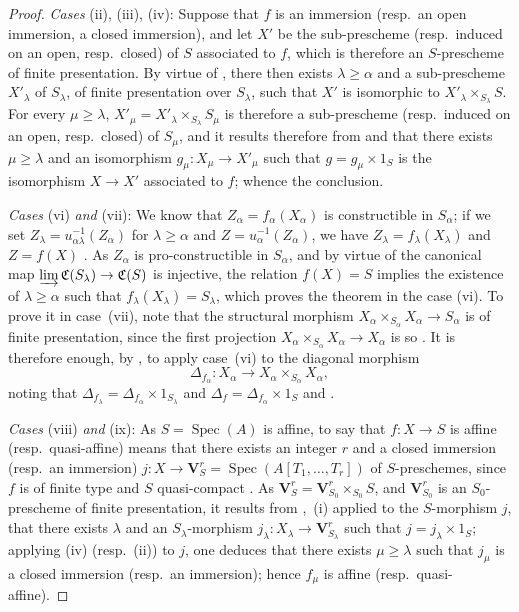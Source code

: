 \begin{proof}
\emph{Cases} (ii), (iii), (iv): Suppose that $f$ is an immersion (resp.\ an open immersion, a closed immersion), and let $X'$ be the sub-prescheme (resp.\ induced on an open, resp.\ closed) of $S$ associated to $f$, which is therefore an $S$-prescheme of finite presentation.
By virtue of , there then exists $\lambda\geqslant\alpha$ and a sub-prescheme $X'_\lambda$ of $S_\lambda$, of finite presentation over $S_\lambda$, such that $X'$ is isomorphic to $X'_\lambda\times_{S_\lambda}S$.
For every $\mu\geqslant\lambda$, $X'_\mu=X'_\lambda\times_{S_\lambda}S_\mu$ is therefore a sub-prescheme (resp.\ induced on an open, resp.\ closed) of $S_\mu$, and it results therefore from  and  that there exists $\mu\geqslant\lambda$ and an isomorphism $g_\mu:X_\mu\to X'_\mu$ such that $g=g_\mu\times 1_S$ is the isomorphism $X\to X'$ associated to $f$; whence the conclusion.

\emph{Cases} (vi) \emph{and} (vii): We know  that $Z_\alpha=f_\alpha(X_\alpha)$ is constructible in $S_\alpha$; if we set $Z_\lambda=u_{\alpha\lambda}^{-1}(Z_\alpha)$ for $\lambda\geqslant\alpha$ and $Z=u_\alpha^{-1}(Z_\alpha)$, we have $Z_\lambda=f_\lambda(X_\lambda)$ and $Z=f(X)$ .
As $Z_\alpha$ is pro-constructible in $S_\alpha$, and by virtue of  the canonical map $\varinjlim\mathfrak{C}(S_\lambda)\to\mathfrak{C}(S)$ is injective, the relation $f(X)=S$ implies the existence of $\lambda\geqslant\alpha$ such that $f_\lambda(X_\lambda)=S_\lambda$, which proves the theorem in the case (vi).
To prove it in case~(vii), note that the structural morphism $X_\alpha\times_{S_\alpha}X_\alpha\to S_\alpha$ is of finite presentation, since the first projection $X_\alpha\times_{S_\alpha}X_\alpha\to X_\alpha$ is so . It is therefore enough, by , to apply case~(vi) to the diagonal morphism
\[
  \Delta_{f_\alpha}:X_\alpha\longrightarrow X_\alpha\times_{S_\alpha}X_\alpha,
\]
noting that $\Delta_{f_\lambda}=\Delta_{f_\alpha}\times1_{S_\lambda}$ and $\Delta_f=\Delta_{f_\alpha}\times1_S$  and .

\emph{Cases} (viii) \emph{and} (ix): As $S=\operatorname{Spec}(A)$ is affine, to say that $f:X\to S$ is affine (resp.\ quasi-affine) means that there exists an integer $r$ and a closed immersion (resp.\ an immersion) $j:X\to\mathbf{V}^r_S=\operatorname{Spec}(A[T_1,\ldots,T_r])$ of $S$-preschemes, since $f$ is of finite type and $S$ quasi-compact .
As $\mathbf{V}^r_S=\mathbf{V}^r_{S_0}\times_{S_0}S$, and $\mathbf{V}^r_{S_0}$ is an $S_0$-prescheme of finite presentation, it results from ,~(i) applied to the $S$-morphism $j$, that there exists $\lambda$ and an $S_\lambda$-morphism $j_\lambda:X_\lambda\to\mathbf{V}^r_{S_\lambda}$ such that $j=j_\lambda\times 1_S$; applying (iv) (resp.\ (ii)) to $j$, one deduces that there exists $\mu\geqslant\lambda$ such that $j_\mu$ is a closed immersion (resp.\ an immersion); hence $f_\mu$ is affine (resp.\ quasi-affine).


\end{proof}
